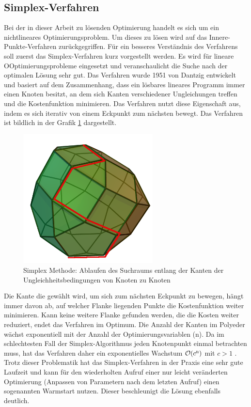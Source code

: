 \documentclass{like}
\begin{document}
\subsection{Simplex-Verfahren}
Bei der in dieser Arbeit zu lösenden Optimierung handelt es sich um ein nichtlineares Op\-ti\-mie\-rungs\-pro\-blem. Um dieses zu lösen wird auf das Innere-Punkte-Verfahren zurück\-ge\-grif\-fen. Für ein besseres Verständnis des Verfahrens soll zuerst das Simplex-Verfahren kurz vorgestellt werden. Es wird für lineare OOp\-ti\-mie\-rungs\-pro\-bleme eingesetzt und ver\-an\-schau\-licht die Suche nach der optimalen Lösung sehr gut. Das Verfahren wurde 1951 von Dantzig \cite{dantzig51} entwickelt und basiert auf dem Zusammenhang, dass ein lösbares lineares Programm immer einen Knoten besitzt, an dem sich Kanten verschiedener Ungleichungen treffen und die Kostenfunktion minimieren. Das Verfahren nutzt diese Eigenschaft aus, indem es sich iterativ von einem Eckpunkt zum nächsten bewegt. Das Verfahren ist bildlich in der Grafik \ref{fig:splxMethod} dargestellt.
\begin{figure}[ht!]
	\centering
	\includegraphics[width=200pt]{Abbildungen/simplexMethod.png}
	\caption{Simplex Methode: Ablaufen des Suchraums entlang der Kanten der Un\-gleich\-heits\-be\-din\-gung\-en von Knoten zu Knoten \cite{simplexWiki:1}}
	\label{fig:splxMethod}
\end{figure}

Die Kante die gewählt wird, um sich zum nächsten Eckpunkt zu bewegen, hängt immer davon ab, auf welcher Flanke liegenden Punkte die Kostenfunktion weiter minimieren. Kann keine weitere Flanke gefunden werden, die die Kosten weiter reduziert, endet das Verfahren im Optimum. Die Anzahl der Kanten im Polyeder wächst exponentiell mit der Anzahl der Optimierungsvariablen (n). Da im schlechtesten Fall der Simplex-Algorithmus jeden Knotenpunkt einmal betrachten muss, hat das Verfahren daher ein exponentielles Wachstum $\mathcal{O}(c\textsuperscript{n})$ mit $c>1$ \cite{doi:10.1137/S0036144502414942}. Trotz dieser Problematik hat das Simplex-Verfahren in der Praxis eine sehr gute Laufzeit und kann für den wiederholten Aufruf einer nur leicht veränderten Optimierung (Anpassen von Parametern nach dem letzten Aufruf) einen sogenannten Warmstart nutzen. Dieser beschleunigt die Lösung ebenfalls deutlich.\\
\end{document}
